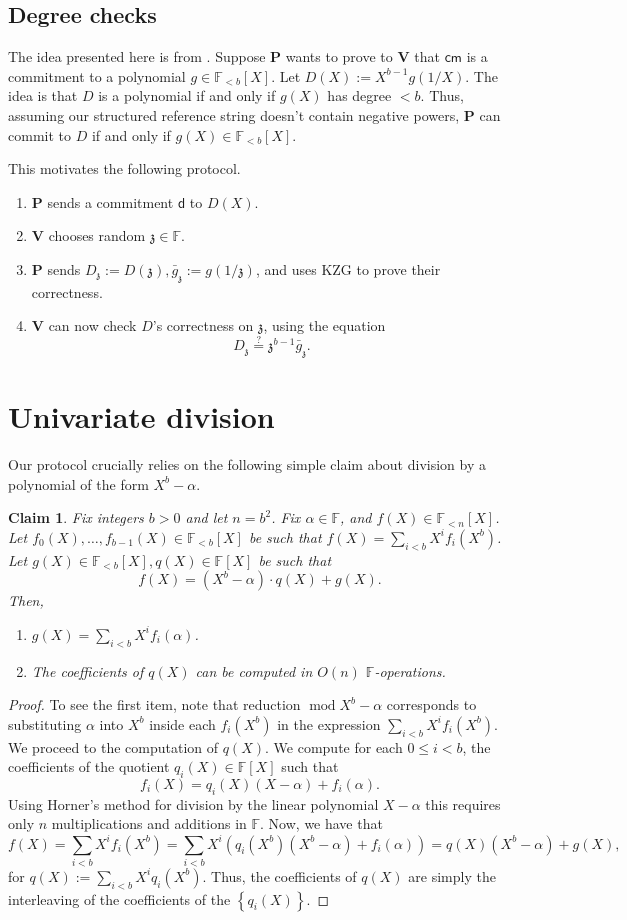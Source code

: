 \documentclass[11pt]{article} %
\newcommand{\F}{\ensuremath{\mathbb F}\xspace}
\newcommand{\cm}{\ensuremath{\mathsf{cm}}\xspace}
\newcommand{\defeq}{:=}
\renewcommand{\mod}{\ensuremath{\;\mathrm{mod}\;}}
\newcommand{\prv}{\ensuremath{\mathsf{\mathbf{P}}}\xspace}
\newcommand{\ver}{\ensuremath{\mathsf{\mathbf{V}}}\xspace}
\newcommand{\set}[1]{\ensuremath{\left\{#1\right\}}\xspace}
\newcommand{\polysofdeg}[1]{\ensuremath{\F_{< #1}[X]}\xspace}
\newcommand{\polys}{\ensuremath{\F[X]}\xspace}
\newcommand{\sumi}[1]{\sum_{i< #1}}
\newtheorem{claim}[lemma]{Claim}
\renewcommand{\d}{\ensuremath{\mathsf{d}}\xspace}
\renewcommand{\zeta}{\mathfrak{z}}
\newcommand{\dzeta}{\ensuremath{D_{\zeta}}\xspace}
\newcommand{\ginv}{\ensuremath{\bar{g}_{\zeta}}\xspace}
\begin{document}
\subsection{Degree checks}
The idea presented here is from \cite{thakur}.
Suppose \prv wants to prove to \ver that \cm is a commitment to a polynomial $g\in \polysofdeg{b}$.
Let $D(X)\defeq  X^{b-1} g(1/X)$. The idea is that $D$ is a polynomial if and only if $g(X)$ has degree $<b$.
Thus, assuming our structured reference string  doesn't contain negative powers, \prv can commit to $D$ if
and only if $g(X)\in \polysofdeg{b}$.

This motivates the following protocol.
\begin{enumerate}
 \item 
\prv sends a commitment \d to $D(X)$.
\item \ver chooses random $\zeta \in \F$.
\item \prv sends $\dzeta \defeq D(\zeta), \ginv \defeq  g(1/\zeta)$, and uses KZG to prove their correctness.
\item \ver can now check $D$'s correctness on   $\zeta$, using the equation
\[\dzeta \stackrel{?}{=}\zeta^{b-1} \ginv.\]

\end{enumerate}

\section{Univariate division}

Our protocol crucially relies on the following simple claim about division by a polynomial of the form
$X^b-\alpha$.
\begin{claim}\label{clm:univariatemod}
 Fix integers $b>0$ and let $n=b^2$. Fix $\alpha\in \F$, and $f(X)\in \polysofdeg{n}$.
Let $f_0(X),\ldots,f_{b-1}(X)\in \polysofdeg{b}$ be such that
$f(X)=\sumi{b}X^i f_i(X^b)$.
 Let $g(X)\in \polysofdeg{b},q(X)\in \polys$ be such that 
 \[f(X)=(X^b-\alpha)\cdot q(X) + g(X).\]
 Then,
 \begin{enumerate}
  \item $g(X)=\sumi{b} X^i f_i(\alpha)$.
  \item The coefficients of $q(X)$ can be computed in $O(n)$ \F-operations.
 \end{enumerate}

\end{claim}
\begin{proof}
To see the first item, note that reduction $\mod X^b-\alpha$ corresponds to substituting $\alpha$ into $X^b$ inside each $f_i(X^b)$ in the expression $\sumi{b}X^i f_i(X^b)$.
We proceed to the computation of $q(X)$.
 We compute for each $0\leq i <b$, the coefficients of the quotient $q_i(X)\in \polys$ such that
\[f_i(X)=q_i(X)(X-\alpha)+ f_i(\alpha).\]
 Using Horner's method for division by the linear polynomial $X-\alpha$ this requires only $n$ multiplications and additions in \F.
Now, we have that
\[f(X)=\sumi{b}X^i f_i(X^b) = \sumi{b} X^i \left(q_i(X^b)(X^b-\alpha)+f_i(\alpha)\right)= q(X)(X^b-\alpha) + g(X),\]
for $q(X)\defeq \sumi{b}X^i q_i(X^b)$.
Thus, the coefficients of $q(X)$ are simply the interleaving of the coefficients of the \set{q_i(X)}.
\end{proof}
\end{document}
